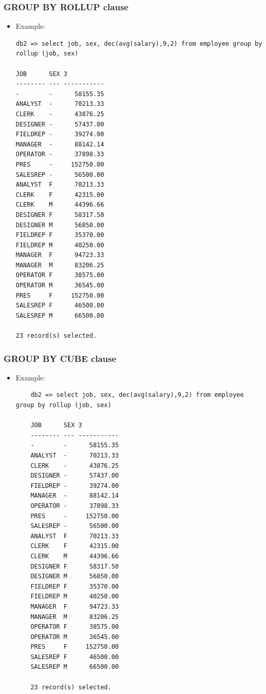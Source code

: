 \documentclass{article}
\begin{document}
\subsubsection*{GROUP BY ROLLUP clause}
\begin{itemize}
\item Example:
\begin{verbatim}
db2 => select job, sex, dec(avg(salary),9,2) from employee group by rollup (job, sex)

JOB      SEX 3
-------- --- -----------
-        -      58155.35
ANALYST  -      70213.33
CLERK    -      43876.25
DESIGNER -      57437.00
FIELDREP -      39274.00
MANAGER  -      88142.14
OPERATOR -      37898.33
PRES     -     152750.00
SALESREP -      56500.00
ANALYST  F      70213.33
CLERK    F      42315.00
CLERK    M      44396.66
DESIGNER F      58317.50
DESIGNER M      56850.00
FIELDREP F      35370.00
FIELDREP M      40250.00
MANAGER  F      94723.33
MANAGER  M      83206.25
OPERATOR F      38575.00
OPERATOR M      36545.00
PRES     F     152750.00
SALESREP F      46500.00
SALESREP M      66500.00

23 record(s) selected.
\end{verbatim}
\end{itemize}

\subsubsection*{GROUP BY CUBE clause}
\begin{itemize}
	\item Example:
	\begin{verbatim}
	db2 => select job, sex, dec(avg(salary),9,2) from employee group by rollup (job, sex)
	
	JOB      SEX 3
	-------- --- -----------
	-        -      58155.35
	ANALYST  -      70213.33
	CLERK    -      43876.25
	DESIGNER -      57437.00
	FIELDREP -      39274.00
	MANAGER  -      88142.14
	OPERATOR -      37898.33
	PRES     -     152750.00
	SALESREP -      56500.00
	ANALYST  F      70213.33
	CLERK    F      42315.00
	CLERK    M      44396.66
	DESIGNER F      58317.50
	DESIGNER M      56850.00
	FIELDREP F      35370.00
	FIELDREP M      40250.00
	MANAGER  F      94723.33
	MANAGER  M      83206.25
	OPERATOR F      38575.00
	OPERATOR M      36545.00
	PRES     F     152750.00
	SALESREP F      46500.00
	SALESREP M      66500.00
	
	23 record(s) selected.
	\end{verbatim}
\end{itemize}


%
%
\end{document}
